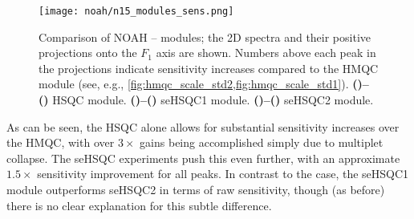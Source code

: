 \begin{figure}[!ht]
    \centering
    \texttt{[image: noah/n15\_modules\_sens.png]}%
    {\label{fig:n15_sens_hsqc}}%
    {\label{fig:n15_sens_hsqcp}}%
    {\label{fig:n15_sens_sehsqc1}}%
    {\label{fig:n15_sens_sehsqc1p}}%
    {\label{fig:n15_sens_sehsqc2}}%
    {\label{fig:n15_sens_sehsqc2p}}%
    \caption[Comparison of sensitivities of NOAH \nitrogen{} modules]{
        Comparison of NOAH \proton{}--\nitrogen{} modules; the 2D spectra and their positive projections onto the $F_1$ axis are shown.
        Numbers above each peak in the projections indicate sensitivity increases compared to the HMQC module (see, e.g., \cref{fig:hmqc_scale_std2,fig:hmqc_scale_std1}).
        \textbf{()--()} HSQC module.
        \textbf{()--()} seHSQC1 module.
        \textbf{()--()} seHSQC2 module.
    }
    \label{fig:n15_sens}
\end{figure}

As can be seen, the HSQC alone allows for substantial sensitivity increases over the HMQC, with over $3\times$ gains being accomplished simply due to multiplet collapse.
The seHSQC experiments push this even further, with an approximate $1.5\times$ sensitivity improvement for all peaks.
In contrast to the \carbon{} case, the \nitrogen{} seHSQC1 module outperforms seHSQC2 in terms of raw sensitivity, though (as before) there is no clear explanation for this subtle difference.

